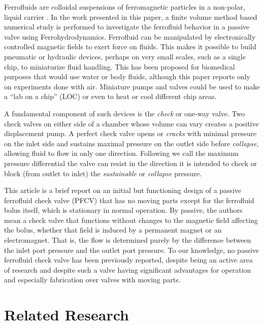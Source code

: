 \documentclass[]{asme2ej}
\begin{document}
Ferrofluids are colloidal suspensions of ferromagnetic particles in a non-polar, liquid carrier \cite{oehlsen2022approaches}.
In the work presented in this paper, a finite volume method based numerical study is performed to investigate the ferrofluid behavior in a passive valve using Ferrohydrodynamics. %
Ferrofluid can be manipulated by electronically controlled magnetic
fields to exert force on fluids\cite{torres2014recent,kole2021engineering,ozbey2015modeling}.
This makes it possible to build pneumatic or hydraulic
devices, perhaps on very small scales,
such as a single chip\cite{yamahata2003ferrofluid,hatch2001ferrofluidic}, to
miniaturize fluid handling.
This has been proposed for biomedical purposes\cite{michelson2019novel}
that would use water or body fluids,
although this paper reports only on experiments done with air.
Miniature pumps and valves could be used to make a “lab on a chip” (LOC) or
even to heat or cool different chip areas.

A fundamental component of such
devices is the {\em check} or one-way valve.
Two check
valves on either side of a chamber whose volume can vary creates a
positive displacement pump.
A perfect check valve opens or
{\em cracks} with minimal pressure on the inlet side and sustains maximal
pressure on the outlet side before {\em collapse},
allowing fluid to flow in only one
direction. Following\cite{hartshorne2004ferrofluid} we call the maximum pressure
differential the valve can resist in the direction it is intended to
check or block (from outlet to inlet) the {\em sustainable} or {\em collapse} pressure.

This article is a brief report on an initial but functioning design of a
passive ferrofluid check valve (PFCV) that has no moving
parts except for the ferrofluid bolus itself, which is stationary
in normal operation.
By passive, the authors
mean a check valve that functions without changes to the magnetic
field affecting the bolus, whether that field is induced by a
permanent magnet or an electromagnet.
That is, the flow is determined
purely by the difference between the inlet port pressure and the
outlet port pressure.
To our knowledge, no passive
ferrofluid check valve has been previously reported, despite being an
active area of research and despite such a valve having
significant advantages for operation and especially
fabrication over valves with moving parts.

\section{Related Research}
\end{document}
